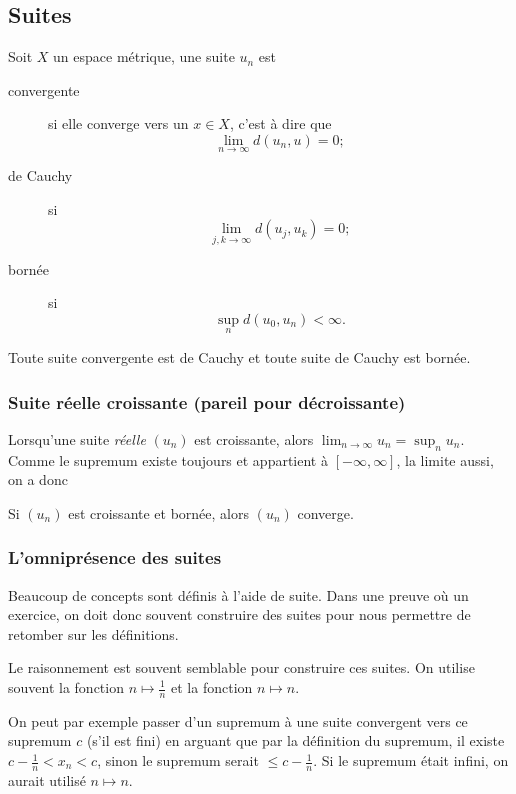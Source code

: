 \subsection{Suites}
\begin{mydef}[2.2]
  Soit $X$ un espace métrique,
  une suite $u_n$ est
  \begin{description}
    \item[convergente] si elle converge vers un $x \in X$,
      c'est à dire que
      \[ \lim_{n\to\infty} d(u_n,u) = 0; \]
    \item[de Cauchy] si
      \[ \lim_{j,k\to\infty} d(u_j,u_k) = 0; \]
    \item[bornée] si
      \[ \sup_n d(u_0,u_n) < \infty. \]
  \end{description}
\end{mydef}

\begin{myprop}[2.2]
  Toute suite convergente est de Cauchy et toute suite
  de Cauchy est bornée.
\end{myprop}

\subsubsection{Suite réelle croissante (pareil pour décroissante)}
\label{sec:Rcroi}
Lorsqu'une suite \emph{réelle} $(u_n)$ est croissante, alors
$\lim_{n\to\infty} u_n = \sup_{n} u_n$.
Comme le supremum existe toujours et appartient à $[-\infty,\infty]$,
la limite aussi, on a donc
\begin{myprop}[1.13]
  Si $(u_n)$ est croissante et bornée,
  alors $(u_n)$ converge.
\end{myprop}

\subsubsection{L'omniprésence des suites}
Beaucoup de concepts sont définis à l'aide de suite.
Dans une preuve où un exercice, on doit donc souvent construire des suites
pour nous permettre de retomber sur les définitions.

Le raisonnement est souvent semblable pour construire ces suites.
On utilise souvent la fonction $n \mapsto \frac{1}{n}$ et
la fonction $n \mapsto n$.

On peut par exemple passer d'un supremum à une suite convergent
vers ce supremum $c$ (s'il est fini) en arguant que par la définition
du supremum, il existe $c - \frac{1}{n} < x_n < c$, sinon
le supremum serait $\leq c - \frac{1}{n}$.
Si le supremum était infini, on aurait utilisé $n \mapsto n$.

